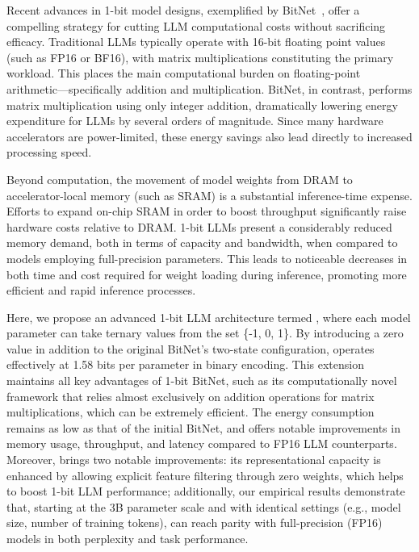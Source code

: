 Recent advances in 1-bit model designs, exemplified by BitNet~\cite{bitnet}, offer a compelling strategy for cutting LLM computational costs without sacrificing efficacy. Traditional LLMs typically operate with 16-bit floating point values (such as FP16 or BF16), with matrix multiplications constituting the primary workload. This places the main computational burden on floating-point arithmetic—specifically addition and multiplication. BitNet, in contrast, performs matrix multiplication using only integer addition, dramatically lowering energy expenditure for LLMs by several orders of magnitude. Since many hardware accelerators are power-limited, these energy savings also lead directly to increased processing speed.

Beyond computation, the movement of model weights from DRAM to accelerator-local memory (such as SRAM) is a substantial inference-time expense. Efforts to expand on-chip SRAM in order to boost throughput significantly raise hardware costs relative to DRAM. 1-bit LLMs present a considerably reduced memory demand, both in terms of capacity and bandwidth, when compared to models employing full-precision parameters. This leads to noticeable decreases in both time and cost required for weight loading during inference, promoting more efficient and rapid inference processes.

Here, we propose an advanced 1-bit LLM architecture termed \textbf{}, where each model parameter can take ternary values from the set \{-1, 0, 1\}. By introducing a zero value in addition to the original BitNet’s two-state configuration,  operates effectively at 1.58 bits per parameter in binary encoding. This extension maintains all key advantages of 1-bit BitNet, such as its computationally novel framework that relies almost exclusively on addition operations for matrix multiplications, which can be extremely efficient. The energy consumption remains as low as that of the initial BitNet, and  offers notable improvements in memory usage, throughput, and latency compared to FP16 LLM counterparts. Moreover,  brings two notable improvements: its representational capacity is enhanced by allowing explicit feature filtering through zero weights, which helps to boost 1-bit LLM performance; additionally, our empirical results demonstrate that, starting at the 3B parameter scale and with identical settings (e.g., model size, number of training tokens),  can reach parity with full-precision (FP16) models in both perplexity and task performance.

